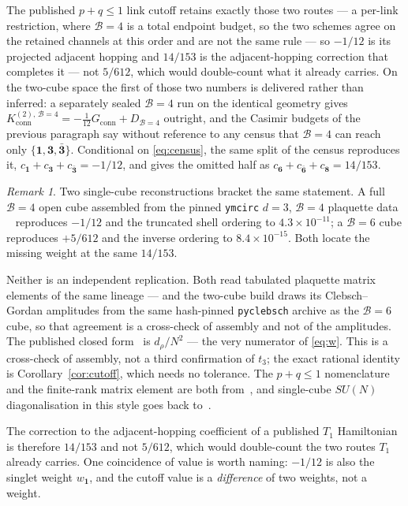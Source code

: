 \documentclass[11pt]{article}
\theoremstyle{plain}
\theoremstyle{definition}
\theoremstyle{remark}
\newtheorem{remark}[theorem]{Remark}
\newcommand{\chk}[1]{}
\begin{document}
\noindent The published $p+q\le1$ link cutoff retains exactly those two
routes --- a per-link restriction, where $\mathcal B=4$ is a total endpoint
budget, so the two schemes agree on the retained channels at this order and are
not the same rule --- so $-1/12$ is its projected adjacent hopping and
$14/153$ is the adjacent-hopping correction that completes it --- not
$5/612$, which would double-count what it already carries. On the two-cube
space the first of those two numbers is delivered rather than inferred: a
separately sealed $\mathcal B=4$ run on the identical geometry gives
$K^{(2),\,\mathcal B=4}_{\mathrm{conn}}=-\tfrac1{12}G_{\mathrm{conn}}+D_{\mathcal B=4}$
outright, and the Casimir budgets of the previous paragraph say without
reference to any census that $\mathcal B=4$ can reach only
$\{\mathbf1,\mathbf3,\bar{\mathbf3}\}$. Conditional on \eqref{eq:census}, the
same split of the census reproduces it,
$c_{\mathbf 1}+c_{\mathbf 3}+c_{\bar{\mathbf 3}}=-1/12$, and gives the omitted
half as $c_{\mathbf 6}+c_{\bar{\mathbf 6}}+c_{\mathbf 8}=14/153$.
\chk{the B=6 six-channel census IS the Weingarten four-channel ledger, channel by channel}
\chk{FINDING: the T1 link cutoff reverses the sign of t\_3, and 14/153 is what it omits}

\begin{remark}
Two single-cube reconstructions bracket the same statement. A full $\mathcal B=4$ open
cube assembled from the pinned \texttt{ymcirc} $d=3$, $\mathcal B=4$ plaquette data
~\cite{Balaji2026,ymcirc2026} reproduces $-1/12$ and the truncated shell ordering to
$4.3\times10^{-11}$; a $\mathcal B=6$ cube reproduces $+5/612$ and the inverse ordering
to $8.4\times10^{-15}$. Both locate the missing weight at the same $14/153$.

Neither is an independent replication. Both read tabulated plaquette matrix
elements of the same lineage --- and the two-cube build draws its
Clebsch--Gordan amplitudes from the same hash-pinned \texttt{pyclebsch} archive
as the $\mathcal B=6$ cube, so that agreement is a cross-check of assembly and not of
the amplitudes. The published closed form~\cite{CBB2025} is
$d_\rho/N^2$ --- the very numerator of \eqref{eq:w}. This is a cross-check of
assembly, not a third confirmation of $t_3$; the exact rational identity is
Corollary~\ref{cor:cutoff}, which needs no tolerance. The $p+q\le1$
nomenclature and the finite-rank matrix element are both from~\cite{CBB2025},
and single-cube $SU(N)$ diagonalisation in this style goes back
to~\cite{CM2003}.

The correction to the adjacent-hopping coefficient of a published $T_1$
Hamiltonian is therefore $14/153$ and not $5/612$, which would double-count
the two routes $T_1$ already carries. One coincidence of value is worth naming:
$-1/12$ is also the singlet weight $w_{\mathbf 1}$, and the cutoff value is a
\emph{difference} of two weights, not a weight.
\chk{FINDING: a full T1 = B = 4 cube Hamiltonian reproduces -1/12 and the reversed shell}
\chk{FINDING: the B = 6 cube flips the sign back to +5/612, closing the decisive test}
\end{remark}
\end{document}
